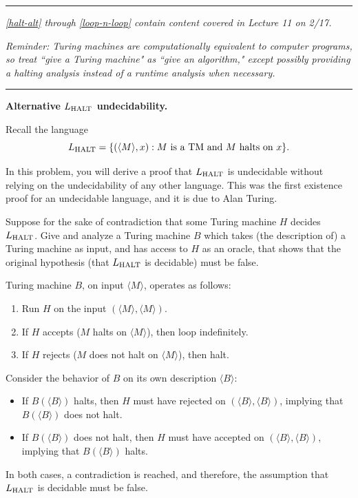 \documentclass[11pt,addpoints,answers]{exam}
\begin{document}
\begin{questions}
  \ifprintanswers
  \else
  \pagebreak
  \fi

  
\medskip \hrule \medskip 
\emph{\cref{halt-alt} through \cref{loop-n-loop} contain content covered in Lecture 11 on 2/17.}

\emph{Reminder: Turing machines are computationally equivalent to computer programs, so treat ``give a Turing machine" as ``give an algorithm," except possibly providing a halting analysis instead of a runtime analysis when necessary.}

\medskip \hrule \medskip

  \question [8] \textbf{Alternative $L_{\text{HALT}}$ undecidability.}  \label{halt-alt}
  
  \nopagebreak

  Recall the language
  \[
        L_{\text{HALT}} = \{(\langle M\rangle,x): \text{$M$ is a TM and $M$ halts on $x$}\} \text .
  \]
  
  In this problem, you will derive a proof that $L_{\text{HALT}}$ is undecidable without relying on the undecidability of any other language.
  This was the first existence proof for an undecidable language, and it is due to Alan Turing.

    
Suppose for the sake of contradiction that some Turing machine $H$ decides $L_{\text{HALT}}$. Give and analyze a Turing machine $B$ which takes (the description of) a Turing machine as input, and has access to $H$ as an oracle, that shows that the original  hypothesis (that $L_{\text{HALT}}$ is decidable) must be false.


    \begin{solution}
    Turing machine $B$, on input $\langle M \rangle$, operates as follows:
    \begin{enumerate}
        \item Run $H$ on the input $(\langle M \rangle, \langle M \rangle)$.
        \item If $H$ accepts ($M$ halts on $\langle M \rangle$), then loop indefinitely.
        \item If $H$ rejects ($M$ does not halt on $\langle M \rangle$), then halt.
    \end{enumerate}
    Consider the behavior of $B$ on its own description $\langle B \rangle$:
    \begin{itemize}
        \item If $B(\langle B \rangle)$ halts, then $H$ must have rejected on $(\langle B \rangle, \langle B \rangle)$, implying that $B(\langle B \rangle)$ does not halt.
        \item If $B(\langle B \rangle)$ does not halt, then $H$ must have accepted on $(\langle B \rangle, \langle B \rangle)$, implying that $B(\langle B \rangle)$ halts.
    \end{itemize}
    In both cases, a contradiction is reached, and therefore, the assumption that $L_{\text{HALT}}$ is decidable must be false.
    \end{solution}


\end{questions}
\end{document}

